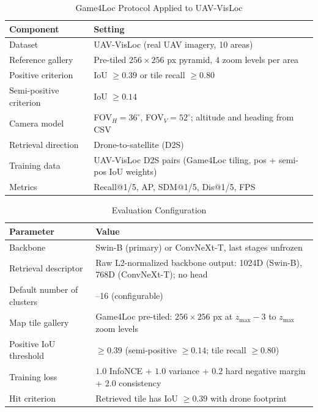 \documentclass[conference]{IEEEtran}
\begin{document}
\begin{table}[htbp]
\caption{Game4Loc Protocol Applied to UAV-VisLoc}
\label{tab:game4loc_condition}
\centering
\footnotesize
\setlength{\tabcolsep}{3pt}
\begin{tabular}{>{\raggedright\arraybackslash}p{}
                >{\raggedright\arraybackslash}p{}}
\toprule
Component & Setting \\
\midrule
Dataset & UAV-VisLoc (real UAV imagery, 10 areas) \\
Reference gallery & Pre-tiled $256{\times}256$ px pyramid, 4 zoom levels per area \\
Positive criterion & IoU $\geq 0.39$ or tile recall $\geq 0.80$ \\
Semi-positive criterion & IoU $\geq 0.14$ \\
Camera model & FOV$_H=36^\circ$, FOV$_V=52^\circ$; altitude and heading from CSV \\
Retrieval direction & Drone-to-satellite (D2S) \\
Training data & UAV-VisLoc D2S pairs (Game4Loc tiling, pos + semi-pos IoU weights) \\
Metrics & Recall@1/5, AP, SDM@1/5, Dis@1/5, FPS \\
\bottomrule
\end{tabular}
\end{table}

\begin{table}[htbp]
\caption{Evaluation Configuration}
\label{tab:config}
\centering
\footnotesize
\setlength{\tabcolsep}{3pt}
\begin{tabular}{>{\raggedright\arraybackslash}p{}
                >{\raggedright\arraybackslash}p{}}
\toprule
Parameter & Value \\
\midrule
Backbone & Swin-B (primary) or ConvNeXt-T, last stages unfrozen \\
Retrieval descriptor & Raw L2-normalized backbone output: 1024D (Swin-B), 768D (ConvNeXt-T); no head \\
Default number of clusters & 8--16 (configurable) \\
Map tile gallery & Game4Loc pre-tiled: $256\times256$ px at $z_{\max}-3$ to $z_{\max}$ zoom levels \\
Positive IoU threshold & $\geq 0.39$ (semi-positive $\geq 0.14$; tile recall $\geq 0.80$) \\
Training loss & $1.0$ InfoNCE + $1.0$ variance + $0.2$ hard negative margin + $2.0$ consistency \\
Hit criterion & Retrieved tile has IoU $\geq 0.39$ with drone footprint \\
\bottomrule
\end{tabular}
\end{table}
\end{document}
